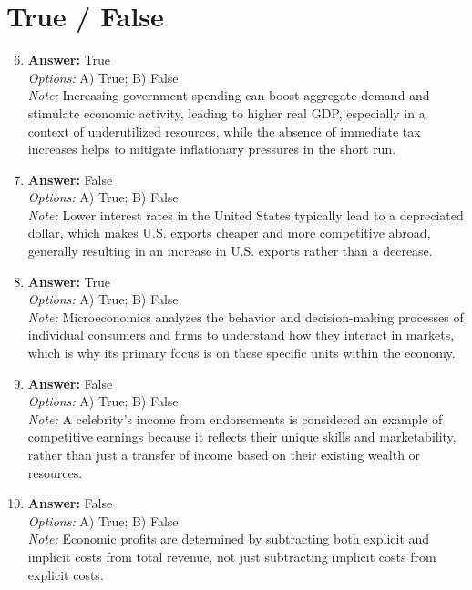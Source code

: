 \documentclass[12pt]{article}
\begin{document}
\section*{True / False}
\begin{enumerate}[label=\arabic*.]
\setcounter{enumi}{5}
\item \textbf{Answer:} True
\\ \textit{Options:} A) True; B) False
\\ \textit{Note:} Increasing government spending can boost aggregate demand and stimulate economic activity, leading to higher real GDP, especially in a context of underutilized resources, while the absence of immediate tax increases helps to mitigate inflationary pressures in the short run.
\item \textbf{Answer:} False
\\ \textit{Options:} A) True; B) False
\\ \textit{Note:} Lower interest rates in the United States typically lead to a depreciated dollar, which makes U.S. exports cheaper and more competitive abroad, generally resulting in an increase in U.S. exports rather than a decrease.
\item \textbf{Answer:} True
\\ \textit{Options:} A) True; B) False
\\ \textit{Note:} Microeconomics analyzes the behavior and decision-making processes of individual consumers and firms to understand how they interact in markets, which is why its primary focus is on these specific units within the economy.
\item \textbf{Answer:} False
\\ \textit{Options:} A) True; B) False
\\ \textit{Note:} A celebrity's income from endorsements is considered an example of competitive earnings because it reflects their unique skills and marketability, rather than just a transfer of income based on their existing wealth or resources.
\item \textbf{Answer:} False
\\ \textit{Options:} A) True; B) False
\\ \textit{Note:} Economic profits are determined by subtracting both explicit and implicit costs from total revenue, not just subtracting implicit costs from explicit costs.
\end{enumerate}
\end{document}
